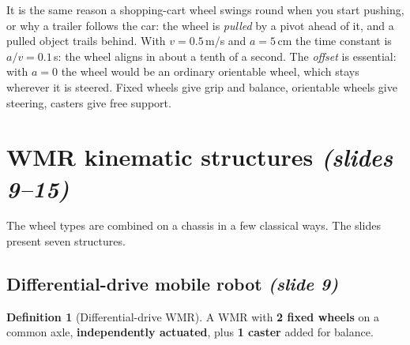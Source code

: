 \documentclass[11pt,a4paper]{article}
\theoremstyle{definition}
\newtheorem{definition}{Definition}[section]
\theoremstyle{plain}
\newtheorem{proposition}[definition]{Proposition}
\begin{document}

\begin{intuition}
It is the same reason a shopping-cart wheel swings round when you start pushing, or why a trailer follows the car: the wheel is \emph{pulled} by a pivot ahead of it, and a pulled object trails behind. With $v=0.5$\,m/s and $a=5$\,cm the time constant is $a/v=0.1$\,s: the wheel aligns in about a tenth of a second. The \emph{offset} is essential: with $a=0$ the wheel would be an ordinary orientable wheel, which stays wherever it is steered. Fixed wheels give grip and balance, orientable wheels give steering, casters give free support.
\end{intuition}

\section{WMR kinematic structures \emph{(slides 9--15)}}

The wheel types are combined on a chassis in a few classical ways. The slides present seven structures.

\subsection{Differential-drive mobile robot \emph{(slide 9)}}

\begin{definition}[Differential-drive WMR]
A WMR with \textbf{2 fixed wheels} on a common axle, \textbf{independently actuated}, plus \textbf{1 caster} added for balance.
\end{definition}
\end{document}
